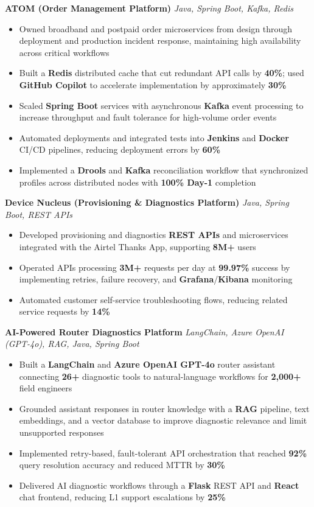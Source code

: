\documentclass[letterpaper,11pt]{article}
\newcommand{\resumeItem}[1]{
  \item\small{{#1 \vspace{-2pt}}}
}
\newcommand{\resumeItemListStart}{\begin{itemize}}
\newcommand{\resumeItemListEnd}{\end{itemize}\vspace{-5pt}}
\begin{document}
      \vspace{4pt}
      \textbf{\small ATOM (Order Management Platform)} \hfill \textit{\small Java, Spring Boot, Kafka, Redis} \\
      \vspace{-2pt}
      \resumeItemListStart
        \resumeItem{Owned broadband and postpaid order microservices from design through deployment and production incident response, maintaining high availability across critical workflows}
        \resumeItem{Built a \textbf{Redis} distributed cache that cut redundant API calls by \textbf{40\%}; used \textbf{GitHub Copilot} to accelerate implementation by approximately \textbf{30\%}}
        \resumeItem{Scaled \textbf{Spring Boot} services with asynchronous \textbf{Kafka} event processing to increase throughput and fault tolerance for high-volume order events}
        \resumeItem{Automated deployments and integrated tests into \textbf{Jenkins} and \textbf{Docker} CI/CD pipelines, reducing deployment errors by \textbf{60\%}}
        \resumeItem{Implemented a \textbf{Drools} and \textbf{Kafka} reconciliation workflow that synchronized profiles across distributed nodes with \textbf{100\% Day-1} completion}
      \resumeItemListEnd

      \vspace{4pt}
      \textbf{\small Device Nucleus (Provisioning \& Diagnostics Platform)} \hfill \textit{\small Java, Spring Boot, REST APIs} \\
      \vspace{-2pt}
      \resumeItemListStart
        \resumeItem{Developed provisioning and diagnostics \textbf{REST APIs} and microservices integrated with the Airtel Thanks App, supporting \textbf{8M+} users}
        \resumeItem{Operated APIs processing \textbf{3M+} requests per day at \textbf{99.97\%} success by implementing retries, failure recovery, and \textbf{Grafana}/\textbf{Kibana} monitoring}
        \resumeItem{Automated customer self-service troubleshooting flows, reducing related service requests by \textbf{14\%}}
      \resumeItemListEnd

      \vspace{4pt}
      \textbf{\small AI-Powered Router Diagnostics Platform} \hfill \textit{\small LangChain, Azure OpenAI (GPT-4o), RAG, Java, Spring Boot} \\
      \vspace{-2pt}
      \resumeItemListStart
        \resumeItem{Built a \textbf{LangChain} and \textbf{Azure OpenAI GPT-4o} router assistant connecting \textbf{26+} diagnostic tools to natural-language workflows for \textbf{2,000+} field engineers}
        \resumeItem{Grounded assistant responses in router knowledge with a \textbf{RAG} pipeline, text embeddings, and a vector database to improve diagnostic relevance and limit unsupported responses}
        \resumeItem{Implemented retry-based, fault-tolerant API orchestration that reached \textbf{92\%} query resolution accuracy and reduced MTTR by \textbf{30\%}}
        \resumeItem{Delivered AI diagnostic workflows through a \textbf{Flask} REST API and \textbf{React} chat frontend, reducing L1 support escalations by \textbf{25\%}}
      \resumeItemListEnd
\end{document}
